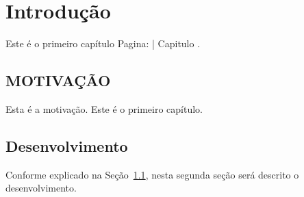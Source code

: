 \chapter{\thechapter \hspace{3mm} Introdu\c{c}\~ao} \label{cap:introduction}

Este \'e o primeiro cap\'itulo Pagina: \thepage | Capitulo \thechapter. 

\section{MOTIVA\c{C}\~AO}\label{sec:motivation}

Esta \'e a motiva\c{c}\~ao. 
Este \'e o primeiro cap\'itulo. 
 


\section{Desenvolvimento}\label{sec:desenv}

Conforme explicado na Se\c{c}\~ao~\ref{sec:motivation}, nesta segunda se\c{c}\~ao ser\'a descrito o desenvolvimento.